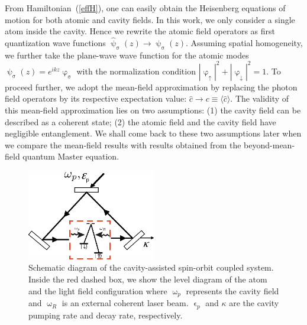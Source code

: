 \documentclass[atoms,article,accept,moreauthors,pdftex,12pt,a4paper]{mdpi}
\begin{document}
From Hamiltonian~(\ref{effH}), one can easily obtain the Heisenberg equations of motion for both atomic and cavity fields. In this work, we only consider a single atom inside the cavity. Hence we rewrite the atomic field operators as first quantization wave functions $ \hat{\uppsi}_\upsigma ({z}) \rightarrow  \uppsi_\upsigma (z)$. Assuming spatial homogeneity, we further take the plane-wave wave function for the atomic modes $\uppsi_\upsigma({z})=e^{i{k} {z}}\upvarphi_\upsigma$ with the normalization condition $|\upvarphi_\uparrow|^2+|\upvarphi_\downarrow|^2=1$. To proceed further, we adopt the mean-field approximation by replacing the photon field operators by its respective expectation value: $\hat{c} \rightarrow c\equiv \langle \hat{c} \rangle$. The validity of this mean-field approximation lies on two assumptions: (1) the cavity field can be described as a coherent state; (2) the atomic field and the cavity field have negligible entanglement. We shall come back to these two assumptions later when we compare the mean-field results with results obtained from the beyond-mean-field quantum Master equation.


\begin{figure}[H]
\centering
\includegraphics[width=0.5\textwidth]{schematic} \vspace{12pt}
\caption{Schematic diagram of the cavity-assisted spin-orbit coupled system. Inside the red dashed box, we show the level diagram of the atom and the light field configuration where $\upomega_p$ represents the cavity field and $\upomega_R$ is an external coherent laser beam. $\upvarepsilon_p$ and $\kappa$ are the cavity pumping rate and decay rate, respectively.}\label{schematic}
\end{figure}
\end{document}
